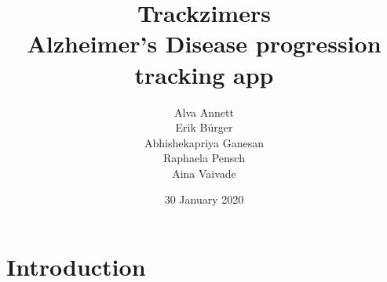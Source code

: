 \documentclass{article}
\title{%
  Trackzimers \\
  \large  Alzheimer’s Disease progression tracking app}
\author{Alva Annett\\Erik Bürger \\ Abhishekapriya Ganesan\\Raphaela Pensch\\Aina Vaivade}
\date{30 January 2020}
\begin{document}
\maketitle

\section{Introduction}



\end{document}
